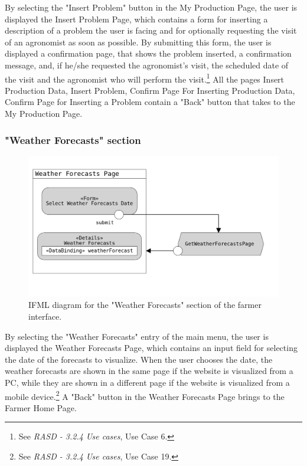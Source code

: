 \documentclass{article}
\begin{document}
By selecting the "Insert Problem" button in the My Production Page, the user is displayed the Insert Problem Page, which contains a form for inserting a description of a problem the user is facing and for optionally requesting the visit of an agronomist as soon as possible. By submitting this form, the user is displayed a confirmation page, that shows the problem inserted, a confirmation message, and, if he/she requested the agronomist's visit, the scheduled date of the visit and the agronomist who will perform the visit.\footnote{See \textit{RASD - 3.2.4 Use cases}, Use Case 6.}\newline
All the pages Insert Production Data, Insert Problem, Confirm Page For Inserting Production Data, Confirm Page for Inserting a Problem contain a "Back" button that takes to the My Production Page.

\subsubsection{"Weather Forecasts" section}
\begin{figure}[H]
    \centering
     \includegraphics[scale=0.15]{diagrams/ui diagrams/farmer/weather forecasts.png}
    \caption{IFML diagram for the "Weather Forecasts" section of the farmer interface.}
\end{figure}
By selecting the "Weather Forecasts" entry of the main menu, the user is displayed the Weather Forecasts Page, which contains an input field for selecting the date of the forecasts to visualize. When the user chooses the date, the weather forecasts are shown in the same page if the website is visualized from a PC, while they are shown in a different page if the website is visualized from a mobile device.\footnote{See \textit{RASD - 3.2.4 Use cases}, Use Case 19.}\newline
A "Back" button in the Weather Forecasts Page brings to the Farmer Home Page.
\end{document}
